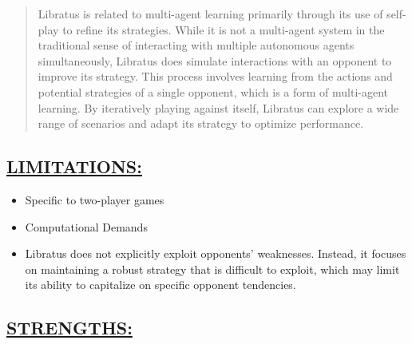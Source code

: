 \documentclass[
]{article}
\begin{document}
\begin{quote}
Libratus is related to multi-agent learning primarily through its use of
self-play to refine its strategies. While it is not a multi-agent system
in the traditional sense of interacting with multiple autonomous agents
simultaneously, Libratus does simulate interactions with an opponent to
improve its strategy. This process involves learning from the actions
and potential strategies of a single opponent, which is a form of
multi-agent learning. By iteratively playing against itself, Libratus
can explore a wide range of scenarios and adapt its strategy to optimize
performance.
\end{quote}

\subsection*{\texorpdfstring{\textbf{\ul{LIMITATIONS:}}}{LIMITATIONS:}}\label{limitations}

\begin{itemize}
\item
  Specific to two-player games
\item
  Computational Demands
\item
  Libratus does not explicitly exploit opponents' weaknesses. Instead,
  it focuses on maintaining a robust strategy that is difficult to
  exploit, which may limit its ability to capitalize on specific
  opponent tendencies.
\end{itemize}

\subsection*{\texorpdfstring{\textbf{\ul{STRENGTHS:}}}{STRENGTHS:}}\label{strengths}
\end{document}
